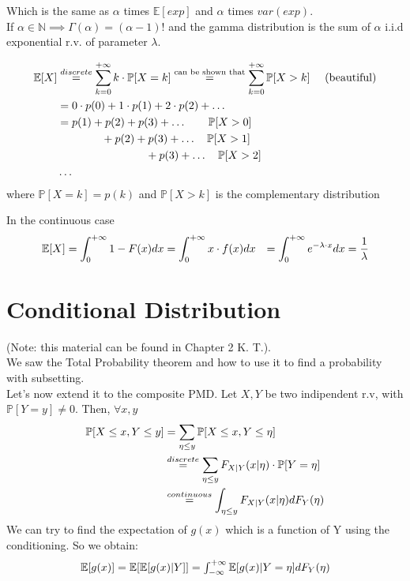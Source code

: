Which is the same as $\alpha$ times $\mathbb{E}[exp]$ and $\alpha$ times $var(exp)$.
\\ If $\alpha \in \mathbb{N} \implies \Gamma(\alpha) = (\alpha-1)!$ and the gamma
distribution is the sum of $\alpha$ i.i.d exponential r.v. of parameter $\lambda$.

\begin{equation} $$
  \begin{split}
  \mathbb{E}[X]&\stackrel{discrete}{=} \sum\limits_{k=0}^{+\infty} k \cdot \mathbb{P}[X=k] 
  \stackrel{\text{can be shown  that}}{=} \sum\limits_{k=0}^{+\infty} \mathbb{P}[X>k] \quad\mbox{  (beautiful)}\\
  &=0 \cdot p(0) + 1 \cdot p(1) + 2 \cdot p(2) + \dots \\
  &= p(1) + p(2) + p(3)+ \dots \qquad \mathbb{P}[X>0]\\
  & \qquad \qquad + p(2) + p(3) +\dots \quad \mathbb{P}[X>1]\\
  & \qquad \qquad \qquad \qquad + p(3)+ \dots \quad \mathbb{P}[X>2] \\
  & \dots
  \end{split}$$
\end{equation}
where $\mathbb{P}[X=k]=p(k)$ and $\mathbb{P}[X>k]$ is the complementary distribution

In the continuous case
\begin{equation}$$
  \begin{split}
    \mathbb{E}[X] &= \int_{0}^{+\infty} 1-F(x) dx = \int_{0}^{+\infty} x \cdot f(x) dx
    &=\int_{0}^{+\infty} e^{-\lambda \cdot x} dx = \frac{1}{\lambda}
  \end{split}$$
\end{equation}

\section{Conditional Distribution}
(Note: this material can be found in Chapter 2 K. T.).\\
We saw the Total Probability theorem and how to use it to find a probability with subsetting.\\
Let's now extend it to the composite PMD. Let $X,Y$ be two indipendent r.v, with $\mathbb{P}[Y=y]\neq 0$.
Then, $\forall x,y$
\begin{equation}$$
  \begin{split}
    \mathbb{P}[X\le x, Y \le y] &= \sum \limits_{\eta \le y} \mathbb{P}[X \le x , Y \le \eta] \\
    &\stackrel{discrete}{=} \sum \limits_{\eta \le y} F_{X|Y}(x | \eta) \cdot \mathbb{P}[Y=\eta]\\
    &\stackrel{continuous}{=} \int_{\eta \le y} F_{X|Y}(x|\eta) dF_Y(\eta)
  \end{split}$$
\end{equation}
We can try to find the expectation of $g(x)$ which is a function of Y using the conditioning. So we obtain:
\begin{equation}
  $$\mathbb{E}[g(x)]=\mathbb{E}[\mathbb{E}[g(x)|Y]] = \int_{-\infty}^{+\infty}\mathbb{E}[g(x)|Y=\eta] dF_Y(\eta)$$
\end{equation}

